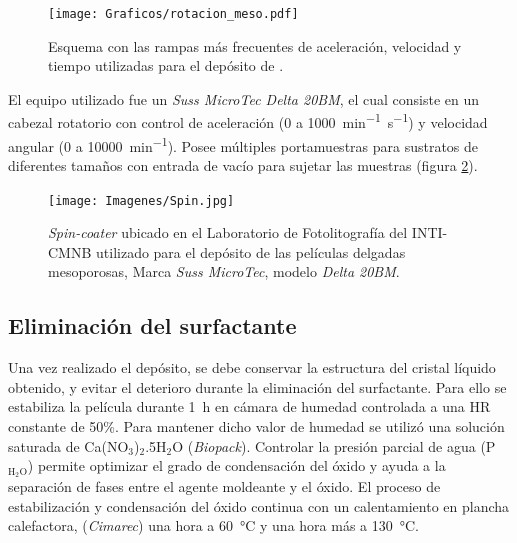 			   		   \begin{figure}[!ht]
						 \begin{center}
						 \texttt{[image: Graficos/rotacion\_meso.pdf]}
						 \caption[Parámetros de depósito para las \pdm]{Esquema con las rampas más frecuentes de aceleración, velocidad y tiempo utilizadas para el depósito de \pdm.}
						 \label{fig:rampa-spin}
						 \end{center}
						 \end{figure}
			
			 El equipo utilizado fue un \textit{Suss MicroTec Delta 20BM}, el cual consiste en un cabezal rotatorio con control de aceleración (0 a  \SI{1000}{\minute^{-1}.\second^{-1}}) y velocidad angular (0 a \SI{10000}{\minute^{-1}}). Posee múltiples portamuestras para sustratos de diferentes tamaños con entrada de vacío para sujetar las muestras (figura \ref{fig:spin}).   		   

					\begin{figure}[ht!]
					  \begin{center}
					  \texttt{[image: Imagenes/Spin.jpg]}
					  \caption[Equipo para el depósito de películas delgadas, \textit{spin-coater}]{\textit{Spin-coater} ubicado en el Laboratorio de Fotolitografía del INTI-CMNB utilizado para el depósito de las películas delgadas mesoporosas, Marca \textit{Suss MicroTec}, modelo \textit{Delta 20BM}.}
					  \label{fig:spin}
					  \end{center}
					  \end{figure}

	\subsection{Eliminación del surfactante}\label{sec:cond_y_extr}

		Una vez realizado el depósito, se debe conservar la estructura del cristal líquido obtenido, y evitar el deterioro durante la eliminación del surfactante. Para ello se estabiliza la película durante \SI{1}{\hour} en cámara de humedad controlada a una HR constante de 50\%. Para mantener dicho valor de humedad se utilizó una solución saturada de Ca(NO$_3$)$_2$.5H$_2$O (\textit{Biopack}). Controlar la presión parcial de agua (P$_{\text{H}_2\text{O}}$) permite optimizar el grado de condensación del óxido y ayuda a la separación de fases entre el agente moldeante y el óxido\cite{Crepaldi2003}. El proceso de estabilización y condensación del óxido continua con un calentamiento en plancha calefactora, (\textit{Cimarec}) una hora a \SI{60}{\celsius} y una hora más a \SI{130}{\celsius}\cite{Crepaldi2003,Crepaldi2002a}. 
				
